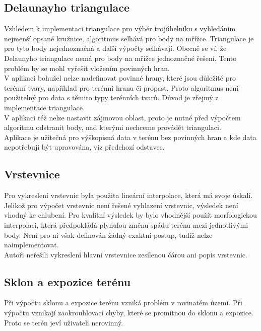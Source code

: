 \documentclass[a4paper, 12pt]{article}
\begin{document}
\subsection{Delaunayho triangulace}
Vzhledem k implementaci triangulace pro výběr trojúhelníku s vyhledáním nejmenší opsané kružnice, algoritmus selhává pro body na mřížce. Triangulace je pro tyto body nejednoznačná a další výpočty selhávají. Obecně se ví, že Delaunyho triangulace nemá pro body na mřížce jednoznačné řešení. Tento problém by se mohl vyřešit vložením povinných hran.\\

V aplikaci bohužel nelze nadefinovat povinné hrany, které jsou důležité pro terénní tvary, například pro terénní hranu či propast. Proto algoritmus není použitelný pro data s těmito typy terénních tvarů. Důvod je zřejmý z implementace triangulace.\\

V aplikaci též nelze nastavit zájmovou oblast, proto je nutné před výpočtem algoritmu odstranit body, nad kterými nechceme provádět triangulaci.\\

Aplikace je užitečná pro výškopisná data v terénu bez povinných hran a kde data nepotřebují být upravována, viz předchozí odstavec. \\

\subsection{Vrstevnice}
Pro vykreslení vrstevnic byla použita lineární interpolace, která má svoje úskalí. Jelikož pro výpočet vrstevnic není řešené vyhlazení vrstevnic, výsledek není vhodný ke chlubení. Pro kvalitní výsledek by bylo vhodnější použít morfologickou interpolaci, která předpokládá plynulou změnu spádu terénu mezi jednotlivými body. Není pro ni však definován žádný exaktní postup, tudíž nelze naimplementovat. \\

Autoři neřešili vykreslení hlavní vrstevnice zesílenou čárou ani popis vrstevnic. \\

\subsection{Sklon a expozice terénu}
Při výpočtu sklonu a expozice terénu vzniká problém v rovinatém území. Při výpočtu vznikají zaokrouhlovací chyby, které se promítnou do sklonu a expozice. Proto se terén jeví uživateli nerovinný.\\
\end{document}
